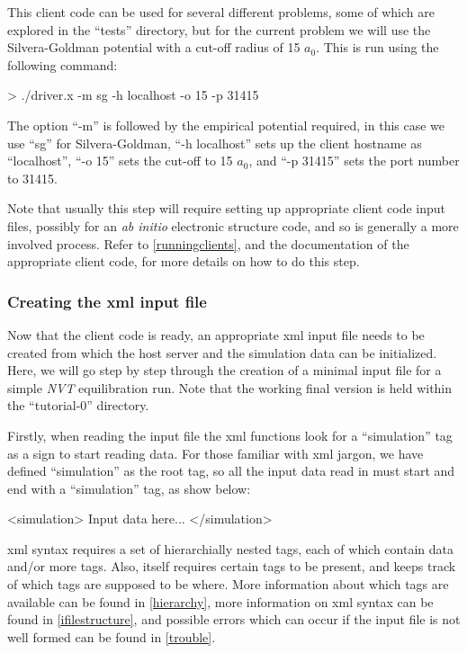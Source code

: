 \documentclass[11pt,english,fleqn]{report}
\newenvironment{code}{%
\footnotesize 
\verbatim
}{
\endverbatim
\normalsize
}
\begin{document}
This client code can be used for several different problems, some of which
are explored in the {}``tests'' directory, but for the current problem
we will use the Silvera-Goldman potential with a cut-off radius
of 15 \(a_0\). This is run using the following command:

\begin{code}
> ./driver.x -m sg -h localhost -o 15 -p 31415
\end{code}

The option {}``-m'' is followed by the empirical potential required,
in this case we use {}``sg'' for Silvera-Goldman, 
{}``-h localhost'' sets up the client hostname
as {}``localhost'', {}``-o 15'' sets the cut-off to 15 \(a_0\), 
and {}``-p 31415'' sets the port number to 31415. 

Note that usually this step will require setting up appropriate
client code input files, possibly for an \emph{ab initio} electronic
structure code, and so is generally a more involved process. Refer
to \ref{runningclients}, and the documentation of the appropriate
client code, for more details on how to do this step.


\subsubsection{Creating the xml input file}

Now that the client code is ready, an appropriate xml input file needs
to be created from which the host server and the simulation data can
be initialized. Here, we will go step by step through the creation
of a minimal input file for a simple \emph{NVT} equilibration run. Note that
the working final version is held within the {}``tutorial-0'' directory.

Firstly, when reading the input file the \ipi xml functions look
for a {}``simulation''
tag as a sign to start reading data. For those familiar with xml jargon,
we have defined {}``simulation'' as the root tag, so all the input
data read in must start and end with a {}``simulation'' tag, as
show below:

\begin{code}
<simulation>
   Input data here...
</simulation>
\end{code}

xml syntax requires a set of hierarchially nested tags, each of which
contain data and/or more tags. Also, \ipi itself requires certain
tags to be present, and keeps track of which tags are supposed to
be where. More information about which tags are available can be found
in \ref{hierarchy}, more information on xml syntax can be found in
\ref{ifilestructure}, and possible errors which can occur if the
input file is not well formed can be found in \ref{trouble}. 
\end{document}
